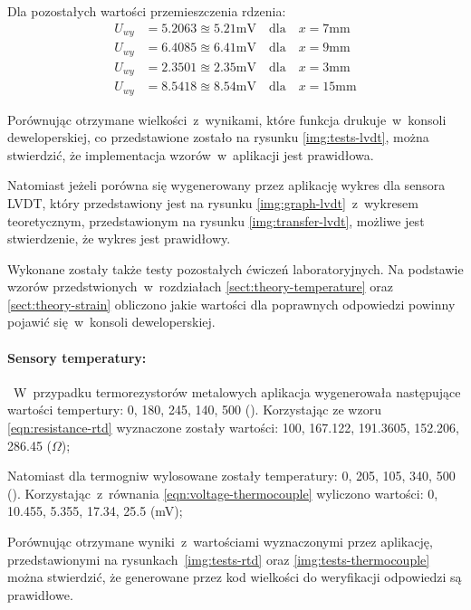 Dla pozostałych wartości przemieszczenia rdzenia:
\begin{align*}
  U_{wy} & =5.2063\approxeq 5.21\text{mV}\quad\text{dla}\quad x=7\text{mm}  \\
  U_{wy} & =6.4085\approxeq 6.41\text{mV}\quad\text{dla}\quad x=9\text{mm}  \\
  U_{wy} & =2.3501\approxeq 2.35\text{mV}\quad\text{dla}\quad x=3\text{mm}  \\
  U_{wy} & =8.5418\approxeq 8.54\text{mV}\quad\text{dla}\quad x=15\text{mm}
\end{align*}

Porównując otrzymane wielkości~z~wynikami, które funkcja drukuje~w~konsoli deweloperskiej, co
przedstawione zostało na rysunku \ref{img:tests-lvdt}, można stwierdzić, że implementacja
wzorów~w~aplikacji jest prawidłowa.


Natomiast jeżeli porówna się wygenerowany przez aplikację wykres
dla sensora LVDT, który przedstawiony jest na rysunku \ref{img:graph-lvdt}~z~wykresem teoretycznym,
przedstawionym na rysunku \ref{img:transfer-lvdt}, możliwe jest stwierdzenie, że wykres jest
prawidłowy.


\FloatBarrier
Wykonane zostały także testy pozostałych ćwiczeń laboratoryjnych. Na podstawie wzorów
przedstwionych~w~rozdziałach \ref{sect:theory-temperature} oraz \ref{sect:theory-strain} obliczono
jakie wartości dla poprawnych odpowiedzi powinny pojawić się~w~konsoli deweloperskiej.

\paragraph{Sensory temperatury:}~W~przypadku termorezystorów metalowych aplikacja wygenerowała
następujące wartości tempertury: 0, 180, 245, 140, 500 (\degC). Korzystając ze wzoru
\ref{eqn:resistance-rtd} wyznaczone zostały wartości: 100, 167.122, 191.3605, 152.206, 286.45
($\Omega$);

Natomiast dla termogniw wylosowane zostały temperatury: 0, 205, 105, 340, 500 (\degC).
Korzystając~z~równania \ref{eqn:voltage-thermocouple} wyliczono wartości: 0, 10.455, 5.355, 17.34,
25.5 (mV);

Porównując otrzymane wyniki~z~wartościami wyznaczonymi przez aplikację, przedstawionymi na
rysunkach~\ref{img:tests-rtd} oraz \ref{img:tests-thermocouple} można stwierdzić, że
generowane przez kod wielkości do weryfikacji odpowiedzi są prawidłowe.

